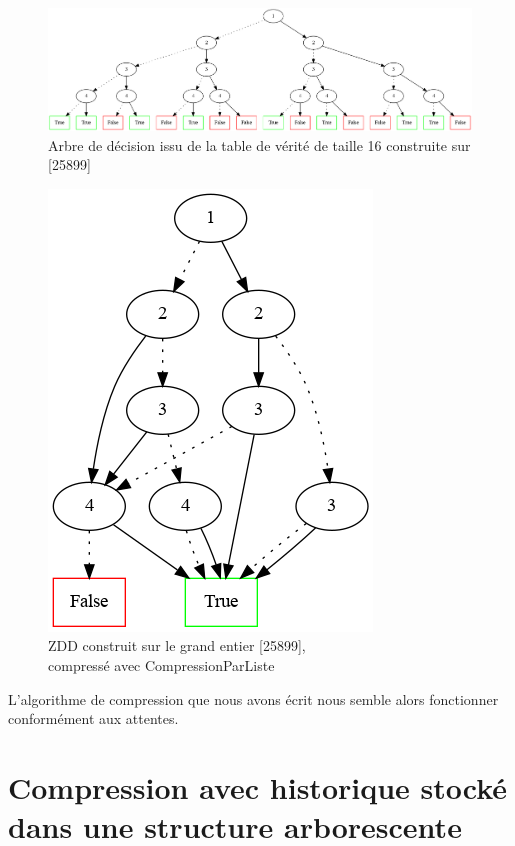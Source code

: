 \documentclass[12pt,a4paper]{article}
\begin{document}
\begin{figure}[hbtp]
\centering
\includegraphics[scale=0.3]{../Images/arbre_non_compresse.png} 
\caption{Arbre de décision issu de la table de vérité de taille 16 construite sur [25899]}
\label{fig1}
\end{figure}



\begin{figure}[hbtp]
\centering
\includegraphics[scale=0.3]{../Images/arbre_compresse_par_liste.png}
\caption{ZDD construit sur le grand entier [25899],\\ compressé avec CompressionParListe}
\label{fig2}
\end{figure}

L'algorithme de compression que nous avons écrit nous semble alors fonctionner conformément aux attentes.

\section{Compression avec historique stocké dans une structure arborescente}
\end{document}
